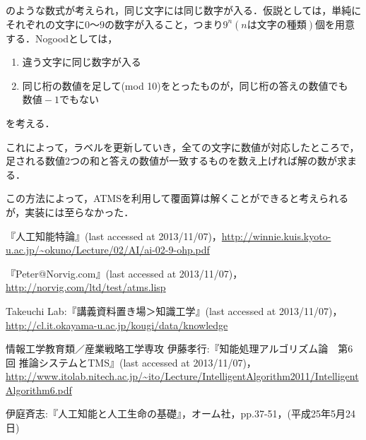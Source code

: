 \documentclass{jarticle}
\begin{document}
のような数式が考えられ，同じ文字には同じ数字が入る．仮説としては，単純にそれぞれの文字に$0〜9$の数字が入ること，つまり$9^n(nは文字の種類)$個を用意する．Nogoodとしては，
\begin{enumerate}
	\item 違う文字に同じ数字が入る
	\item 同じ桁の数値を足して(mod 10)をとったものが，同じ桁の答えの数値でも$数値-1$でもない
\end{enumerate}
を考える．

これによって，ラベルを更新していき，全ての文字に数値が対応したところで，足される数値2つの和と答えの数値が一致するものを数え上げれば解の数が求まる．

この方法によって，ATMSを利用して覆面算は解くことができると考えられるが，実装には至らなかった．

\begin{thebibliography}{n}
『人工知能特論』(last accessed at 2013/11/07)，\url{http://winnie.kuis.kyoto-u.ac.jp/~okuno/Lecture/02/AI/ai-02-9-ohp.pdf}

『Peter@Norvig.com』(last accessed at 2013/11/07)，\url{http://norvig.com/ltd/test/atms.lisp}

Takeuchi Lab:『講義資料置き場＞知識工学』(last accessed at 2013/11/07)，\url{http://cl.it.okayama-u.ac.jp/kougi/data/knowledge}

情報工学教育類／産業戦略工学専攻 伊藤孝行:『知能処理アルゴリズム論　第6回 推論システムとTMS』(last accessed at 2013/11/07)，\url{http://www.itolab.nitech.ac.jp/~ito/Lecture/IntelligentAlgorithm2011/IntelligentAlgorithm6.pdf}

伊庭斉志:『人工知能と人工生命の基礎』，オーム社，pp.37-51，(平成25年5月24日)

\end{thebibliography}
\end{document}

